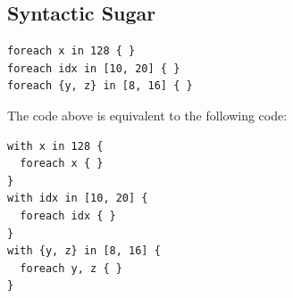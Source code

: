 \subsection*{Syntactic Sugar}

\begin{lstlisting}[language=croqtile,caption={A foreach loop}]
foreach x in 128 { }
foreach idx in [10, 20] { }
foreach {y, z} in [8, 16] { }
\end{lstlisting}

The code above is equivalent to the following code:

\begin{lstlisting}[language=croqtile,caption={The with-in form it expands to}]
with x in 128 {
  foreach x { }
}
with idx in [10, 20] {
  foreach idx { }
}
with {y, z} in [8, 16] {
  foreach y, z { }
}
\end{lstlisting}
